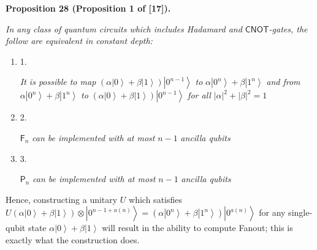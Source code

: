\documentclass[10pt,a4paper]{article}
\begin{document}


\par\medskip\noindent\textbf{
\textbf{Proposition 28}\textbf{ }(Proposition 1 of [17])\textbf{.}
}\par



\emph{In any class of quantum circuits which includes Hadamard and $\mathsf{CNOT}$-gates, the follow are equivalent in constant depth:}\par


\begin{enumerate}


\item[] 
1. 


\emph{It is possible to map }$(\alpha\left|0\right\rangle+\beta\left|1\right\rangle)\left|0^{n-1}\right\rangle$\emph{ to }$\alpha\left|0^{n}\right\rangle+\beta\left|1^{n}\right\rangle$\emph{ and from }$\alpha\left|0^{n}\right\rangle+\beta\left|1^{n}\right\rangle$\emph{ to }$(\alpha\left|0\right\rangle+\beta\left|1\right\rangle)\left|0^{n-1}\right\rangle$\emph{ for all }$|\alpha|^{2}+|\beta|^{2}=1$\emph{}\par





\item[] 
2. 


$\mathsf{F}_{n}$\emph{ can be implemented with at most }$n-1$\emph{ ancilla qubits}\par





\item[] 
3. 


${\mathsf{P}}_{n}$\emph{ can be implemented with at most }$n-1$\emph{ ancilla qubits}\par





\end{enumerate}






Hence, constructing a unitary $U$ which satisfies $U(\alpha\left|0\right\rangle+\beta\left|1\right\rangle)\otimes\left|0^{n-1+a(n)}\right\rangle=(\alpha\left|0^{n}\right\rangle+\beta\left|1^{n}\right\rangle)\left|0^{a(n)}\right\rangle$ for any single-qubit state $\alpha\left|0\right\rangle+\beta\left|1\right\rangle$ will result in the ability to compute Fanout; this is exactly what the construction does.\par
\end{document}
